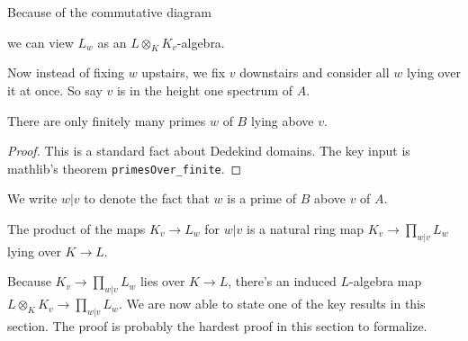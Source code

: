 Because of the commutative diagram
\begin{center}
\end{center}

we can view $L_w$ as an $L\otimes_KK_v$-algebra.

Now instead of fixing $w$ upstairs, we fix $v$ downstairs and consider all $w$ lying
over it at once. So say $v$ is in the height one spectrum of $A$.

\begin{lemma}
  \label{IsDedekindDomain.HeightOneSpectrum.Extension.finite}
  \leanok
  There are only finitely many primes $w$ of $B$ lying above $v$.
\end{lemma}
\begin{proof}
  \leanok
  This is a standard fact about Dedekind domains. The key input is
  mathlib's theorem {\tt primesOver\_finite}.
\end{proof}

We write $w|v$ to denote the fact that $w$ is a prime of $B$ above $v$ of $A$.

\begin{definition}
  \label{IsDedekindDomain.HeightOneSpectrum.adicCompletion.semialgHomPi}
  \leanok
  The product of the maps $K_v\to L_w$ for $w|v$ is a natural ring map $K_v\to\prod_{w|v}L_w$
  lying over $K\to L$.
\end{definition}

Because $K_v\to\prod_{w|v}L_w$ lies over $K\to L$, there's an induced $L$-algebra
map $L\otimes_KK_v\to\prod_{w|v}L_w$. We are now able to state one of the key results
in this section. The proof is probably the hardest proof
in this section to formalize.

